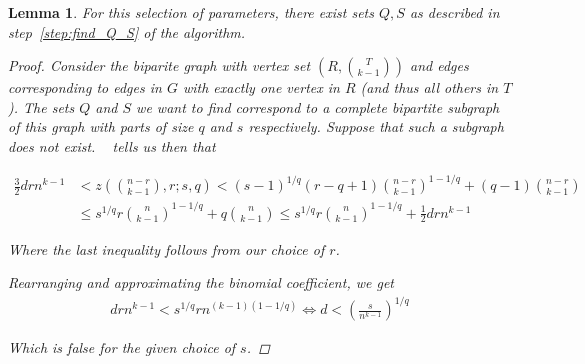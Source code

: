 \documentclass[12pt]{article}
\newtheorem{lemma}[thm]{Lemma}
\begin{document}
    \begin{lemma}\label{lemma:q_s}
        For this selection of parameters,
        there exist sets $Q, S$ as described in step~\ref{step:find_Q_S} of the algorithm.

        \begin{proof}

            Consider the biparite graph with vertex set $\left( R, \binom{T}{k-1} \right)$
            and edges corresponding to edges in $G$ with exactly one vertex in $R$ (and thus all others in $T$).
            The sets $Q$ and $S$ we want to find correspond to a complete bipartite subgraph of this graph
            with parts of size $q$ and $s$ respectively.
            Suppose that such a subgraph does not exist.
            ~\cite{Kovari1954} tells us then that

            \begin{align*}\label{eq:equation}
                \frac{3}{2}drn^{k-1} & < z\left(\binom{n-r}{k-1}, r; s, q  \right) < (s-1)^{1/q}(r-q+1)\binom{n-r}{k-1}^{1-1/q} + (q-1)\binom{n-r}{k-1} \\
                           & \leq s^{1/q} r \binom{n}{k-1}^{1-1/q} + q \binom{n}{k-1} \leq s^{1/q} r \binom{n}{k-1}^{1-1/q} + \frac{1}{2} drn^{k-1}
            \end{align*}

            Where the last inequality follows from our choice of $r$.

            Rearranging and approximating the binomial coefficient, we get
            \begin{align*}
                drn^{k-1} < s^{1/q}r n^{(k-1)(1-1/q)} \iff d < \left( \frac{s}{n^{k-1}} \right)^{1/q}
            \end{align*}

            Which is false for the given choice of $s$.

        \end{proof}

    \end{lemma}
\end{document}
